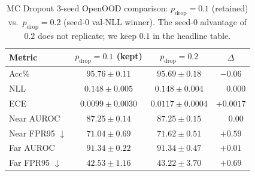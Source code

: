 \begin{table}[h]
\centering
\caption{MC Dropout 3-seed OpenOOD comparison: $p_{\text{drop}} = 0.1$
(retained) vs.\ $p_{\text{drop}} = 0.2$ (seed-0 val-NLL winner). The
seed-0 advantage of $0.2$ does not replicate; we keep $0.1$ in the
headline table.}
\label{tab:mcd-3seed}
\small
\begin{tabular}{l c c c}
\toprule
Metric & $p_{\text{drop}} = 0.1$ (kept) & $p_{\text{drop}} = 0.2$ & $\Delta$ \\
\midrule
Acc\%      & $95.76 \pm 0.11$            & $95.69 \pm 0.18$            & $-0.06$ \\
NLL        & $0.148 \pm 0.005$           & $0.148 \pm 0.004$           & $\phantom{+}0.000$ \\
ECE        & $\mathbf{0.0099 \pm 0.0030}$ & $0.0117 \pm 0.0004$        & $+0.0017$ \\
Near AUROC & $87.25 \pm 0.14$            & $87.25 \pm 0.15$            & $\phantom{+}0.00$ \\
Near FPR95 $\downarrow$ & $\mathbf{71.04 \pm 0.69}$ & $71.62 \pm 0.51$  & $+0.59$ \\
Far AUROC  & $91.34 \pm 0.22$            & $91.34 \pm 0.47$            & $+0.01$ \\
Far FPR95 $\downarrow$  & $\mathbf{42.53 \pm 1.16}$ & $43.22 \pm 3.70$ & $+0.69$ \\
\bottomrule
\end{tabular}
\end{table}
